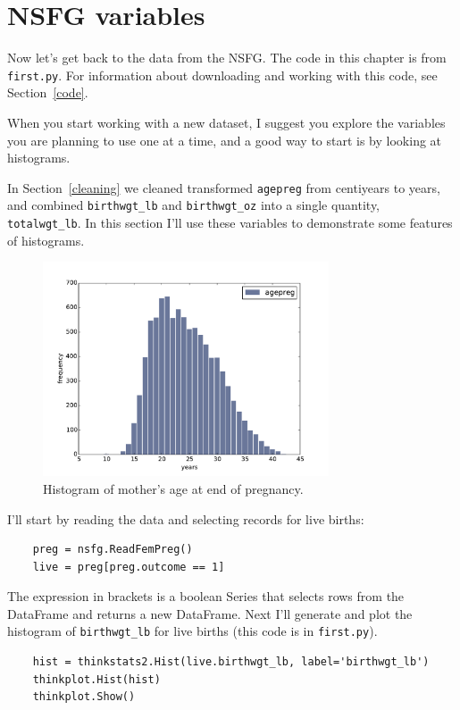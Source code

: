 \documentclass[12pt]{book}
\begin{document}
\section{NSFG variables}

Now let's get back to the data from the NSFG.  The code in this
chapter is from {\tt first.py}.  For information about downloading and
working with this code, see Section~\ref{code}.

When you start working with a new dataset, I suggest you explore
the variables you are planning to use one at a time, and a good
way to start is by looking at histograms.

In Section~\ref{cleaning} we cleaned transformed {\tt agepreg}
from centiyears to years, and combined \verb"birthwgt_lb" and
\verb"birthwgt_oz" into a single quantity, \verb"totalwgt_lb".
In this section I'll use these variables to demonstrate some
features of histograms.

\begin{figure}
\centerline{\includegraphics[height=2.5in]{figs/first_agepreg_hist.pdf}}
\caption{Histogram of mother's age at end of pregnancy.}
\label{first_agepreg_hist}
\end{figure}

I'll start by reading the data and selecting records for live
births:

\begin{verbatim}
    preg = nsfg.ReadFemPreg()
    live = preg[preg.outcome == 1]
\end{verbatim}

The expression in brackets is a boolean Series that
selects rows from the DataFrame and returns a new DataFrame.
Next I'll generate and plot the histogram of
\verb"birthwgt_lb" for live births (this code is in {\tt first.py}).

\begin{verbatim}
    hist = thinkstats2.Hist(live.birthwgt_lb, label='birthwgt_lb')
    thinkplot.Hist(hist)
    thinkplot.Show()
\end{verbatim}
\end{document}
